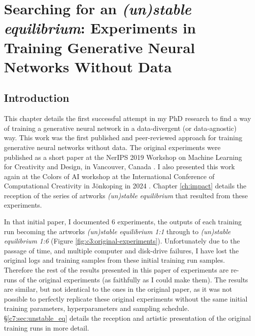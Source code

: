 \chapter{Searching for an \textit{(un)stable equilibrium}:
Experiments in Training Generative Neural Networks Without Data}
\label{ch:unstable_eq}

\section{Introduction}

This chapter details the first successful attempt in my PhD research to find a way of training a generative neural network in a data-divergent (or data-agnostic) way. 
This work was the first published and peer-reviewed approach for training generative neural networks without data.
The original experiments were published as a short paper at the NerIPS 2019 Workshop on Machine Learning for Creativity and Design, in Vancouver, Canada \citep{broad2019searching}. 
I also presented this work again at the Colors of AI workshop at the International Conference of Computational Creativity in Jönkoping in 2024 \citep{riccio2024colours}.
Chapter \ref{ch:impact} details the reception of the series of artworks \textit{(un)stable equilibrium} that resulted from these experiments. 

In that initial paper, I documented 6 experiments, the outputs of each training run becoming the artworks \textit{(un)stable equilibrium 1:1} through to \textit{(un)stable equilibrium 1:6} (Figure \ref{fig:c3:original-experiments}). Unfortunately due to the passage of time, and multiple computer and disk-drive failures, I have lost the original logs and training samples from these initial training run samples. 
Therefore the rest of the results presented in this paper of experiments are re-runs of the original experiments (as faithfully as I could make them). The results are similar, but not identical to the ones in the original paper, as it was not possible to perfectly replicate these original experiments without the same initial training parameters, hyperparameters and sampling schedule. \S \ref{c7:sec:unstable_eq} details the reception and artistic presentation of the original training runs in more detail. 

